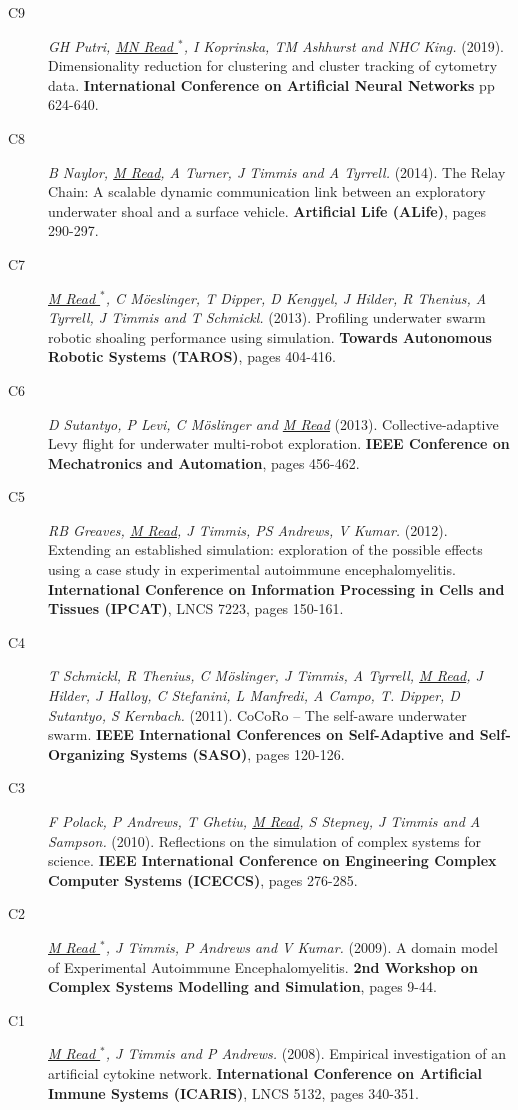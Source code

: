 \documentclass[a4paper]{article}
\begin{document}
\begin{description}
\item[C9]
\textit{GH Putri, \underline{MN Read $^{*}$}, I Koprinska, TM Ashhurst and NHC King.}
(2019).
Dimensionality reduction for clustering and cluster tracking of cytometry data.
\textbf{International Conference on Artificial Neural Networks} pp 624-640.

\item[C8]
\textit{B Naylor, \underline{M Read}, A Turner, J Timmis and A Tyrrell.}
(2014).
The Relay Chain: A scalable dynamic communication link between an exploratory underwater shoal and a surface vehicle.
\textbf{Artificial Life (ALife)}, pages 290-297.

\item[C7]
\textit{\underline{M Read $^{*}$}, C M\"oeslinger, T Dipper, D Kengyel, J Hilder, R Thenius, A Tyrrell, J Timmis and T Schmickl.}
(2013).
Profiling underwater swarm robotic shoaling performance using simulation.
\textbf{Towards Autonomous Robotic Systems (TAROS)}, pages 404-416.

\item[C6]
\textit{D Sutantyo, P Levi, C M\"oslinger and \underline{M Read}}
(2013).
Collective-adaptive Levy flight for underwater multi-robot exploration.
\textbf{IEEE Conference on Mechatronics and Automation}, pages 456-462.

\item[C5]
\textit{RB Greaves, \underline{M Read}, J Timmis, PS Andrews, V Kumar.}
(2012).
Extending an established simulation: exploration of the possible effects using a case study in experimental autoimmune encephalomyelitis.
\textbf{International Conference on Information Processing in Cells and Tissues (IPCAT)}, LNCS 7223, pages 150-161.

\item[C4]
\textit{T Schmickl, R Thenius, C M\"oslinger, J Timmis, A Tyrrell, \underline{M Read}, J Hilder, J Halloy, C Stefanini, L Manfredi, A Campo, T. Dipper, D Sutantyo, S Kernbach.}
(2011).
CoCoRo – The self-aware underwater swarm.
\textbf{IEEE International Conferences on Self-Adaptive and Self-Organizing Systems (SASO)}, pages 120-126.

\item[C3]
\textit{F Polack, P Andrews, T Ghetiu, \underline{M Read}, S Stepney, J Timmis and A Sampson.}
(2010).
Reflections on the simulation of complex systems for science.
\textbf{IEEE International Conference on Engineering Complex Computer Systems (ICECCS)}, pages 276-285.

\item[C2]
\textit{\underline{M Read $^{*}$}, J Timmis, P Andrews and V Kumar.}
(2009).
A domain model of Experimental Autoimmune Encephalomyelitis.
\textbf{2nd Workshop on Complex Systems Modelling and Simulation}, pages 9-44.

\item[C1]
\textit{\underline{M Read $^{*}$}, J Timmis and P Andrews.}
(2008).
Empirical investigation of an artificial cytokine network.
\textbf{International Conference on Artificial Immune Systems (ICARIS)}, LNCS 5132, pages 340-351.
\end{description}
\end{document}
